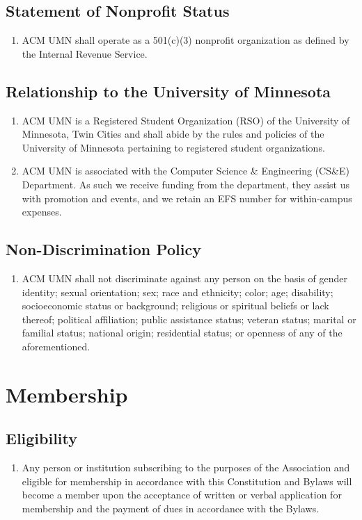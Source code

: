 \subsection{Statement of Nonprofit Status}
\begin{enumerate}
	\item ACM UMN shall operate as a 501(c)(3) nonprofit organization as defined by the Internal Revenue Service.
\end{enumerate}

\subsection{Relationship to the University of Minnesota}
\begin{enumerate}
	\item ACM UMN is a Registered Student Organization (RSO) of the University of Minnesota, Twin Cities and shall abide by the rules and policies of the University of Minnesota pertaining to registered student organizations.
	\item ACM UMN is associated with the Computer Science \& Engineering (CS\&E) Department. As such we receive funding from the department, they assist us with promotion and events, and we retain an EFS number for within-campus expenses.
\end{enumerate}

\subsection{Non-Discrimination Policy}
\begin{enumerate}
	\item ACM UMN shall not discriminate against any person on the basis of gender identity; sexual orientation; sex; race and ethnicity; color; age; disability; socioeconomic status or background; religious or spiritual beliefs or lack thereof; political affiliation; public assistance status; veteran status; marital or familial status; national origin; residential status; or openness of any of the aforementioned.
\end{enumerate}

\section{Membership}

\subsection{Eligibility}
\begin{enumerate}
	\item Any person or institution subscribing to the purposes of the Association and eligible for membership in accordance with this Constitution and Bylaws will become a member upon the acceptance of written or verbal application for membership and the payment of dues in accordance with the Bylaws.
\end{enumerate}


